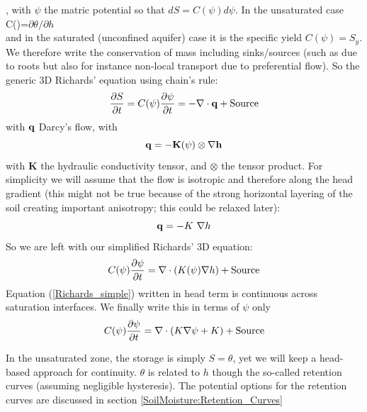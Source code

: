 \documentclass{article}
\begin{document}
, with $\psi$ the matric potential so that $dS = C(\psi)d\psi$. In the unsaturated case C(\psi)=$\partial \theta /\partial h$ \\ and in the saturated (unconfined aquifer) case it is the specific yield $C(\psi)=S_y$.
We therefore write the conservation of mass including sinks/sources (such as due to roots but also for instance non-local transport due to preferential flow). 
So the generic 3D Richards' equation using chain's rule:
\begin{equation}
     \frac{\partial S}{\partial t} = C(\psi)\frac{\partial \psi}{\partial t} = -\nabla \cdot {\bf{q}} + {\rm Source}
\label{Richards}
\end{equation}
with $\bf{q}$ Darcy's flow, with 
\begin{equation}
     \bf{q} = - \mathbf{K}(\psi) \otimes \nabla h
\end{equation} with $ \mathbf{K}$ the hydraulic conductivity tensor, and $\otimes$ the tensor product.
For simplicity we will assume that the flow is isotropic and therefore along the head gradient (this might not be true because of the strong horizontal layering of the soil creating important anisotropy; this could be relaxed later):
\begin{equation}
     {\bf{q}} = - K \ \nabla h
\end{equation}
So we are left with our simplified Richards' 3D equation:
\begin{equation}
     C(\psi)\frac{\partial \psi}{\partial t}  = \nabla \cdot \left( {K(\psi) \nabla h} \right) + {\rm Source}
\label{Richards_simple}
\end{equation}
Equation (\ref{Richards_simple}) written in head term is continuous across saturation interfaces.
We finally write this in terms of $\psi$ only
\begin{equation}
     C(\psi)\frac{\partial \psi}{\partial t}  = \nabla \cdot \left( {K \nabla \psi} + K \right) + {\rm Source}
\label{Richards_simple}
\end{equation}


In the unsaturated zone, the storage is simply $S=\theta$, yet we will keep a head-based approach for continuity. $\theta$ is related to $h$ though the so-called retention curves (assuming negligible hysteresis). The potential options for the retention curves are discussed in section \ref{SoilMoisture:Retention_Curves}
\end{document}
